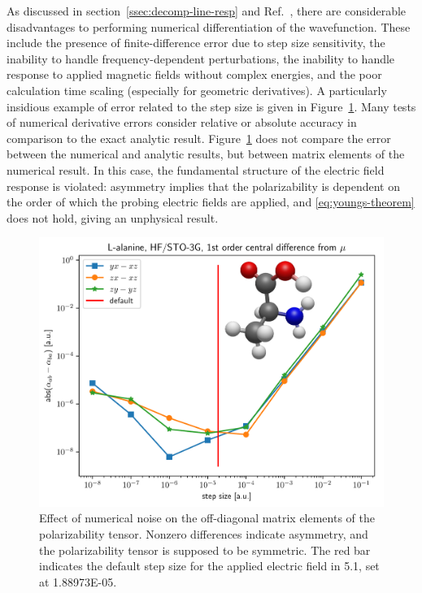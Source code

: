 \documentclass[%
class = book,%
crop = false,%
float = true,%
multi = true,%
preview = false,%
]{standalone}
\begin{document}
As discussed in section~\ref{ssec:decomp-line-resp} and Ref.~\parencite{gauss2000}, there are considerable disadvantages to performing numerical differentiation of the wavefunction. These include the presence of finite-difference error due to step size sensitivity, the inability to handle frequency-dependent perturbations, the inability to handle response to applied magnetic fields without complex energies, and the poor calculation time scaling (especially for geometric derivatives). A particularly insidious example of error related to the step size is given in Figure~\ref{fig:finite-difference-numerical-noise}. Many tests of numerical derivative errors consider relative or absolute accuracy in comparison to the exact analytic result. Figure~\ref{fig:finite-difference-numerical-noise} does not compare the error between the numerical and analytic results, but between matrix elements of the numerical result. In this case, the fundamental structure of the electric field response is violated: asymmetry implies that the polarizability is dependent on the order of which the probing electric fields are applied, and \eqref{eq:youngs-theorem} does not hold, giving an unphysical result.

\begin{figure}
  \centering
  \includegraphics[width=\textwidth]{./diff_overlay.pdf}
  \caption[Asymmetry in the 1st-order finite-difference polarizability]{Effect of numerical noise on the off-diagonal matrix elements of the polarizability tensor. Nonzero differences indicate asymmetry, and the polarizability tensor is supposed to be symmetric. The red bar indicates the default step size for the applied electric field in \qchem{} 5.1, set at \SI{1.88973E-05}{\au}.\label{fig:finite-difference-numerical-noise}}
\end{figure}
\end{document}
